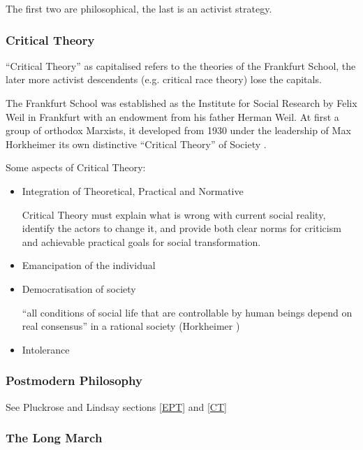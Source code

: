 \documentclass[10pt,titlepage]{book}
\begin{document}
The first two are philosophical, the last is an activist strategy.

\subsubsection{Critical Theory}

``Critical Theory'' as capitalised refers to the theories of the Frankfurt School, the later more activist descendents (e.g. critical race theory) lose the capitals.

The Frankfurt School was established as the Institute for Social Research by Felix Weil in Frankfurt with an endowment from his father Herman Weil.
At first a group of orthodox Marxists, it developed from 1930 under the leadership of Max Horkheimer its own distinctive ``Critical Theory'' of Society \cite{horkheimer-trad,horkheimer-crit}.


Some aspects of Critical Theory:

\begin{itemize}
\item Integration of Theoretical, Practical and Normative

  Critical Theory must explain what is wrong with current social reality, identify the actors to change it, and provide both clear norms for criticism and achievable practical goals for social transformation.
  
\item Emancipation of the individual
  
\item Democratisation of society

  “all conditions of social life that are controllable by human beings depend on real consensus” in a rational society (Horkheimer \cite{horkheimer-crit})

  \item Intolerance
\end{itemize}

\subsubsection{Postmodern Philosophy}

See Pluckrose and Lindsay sections \ref{EPT} and \ref{CT} 

\subsubsection{The Long March}\label{LongMarch}
\end{document}
